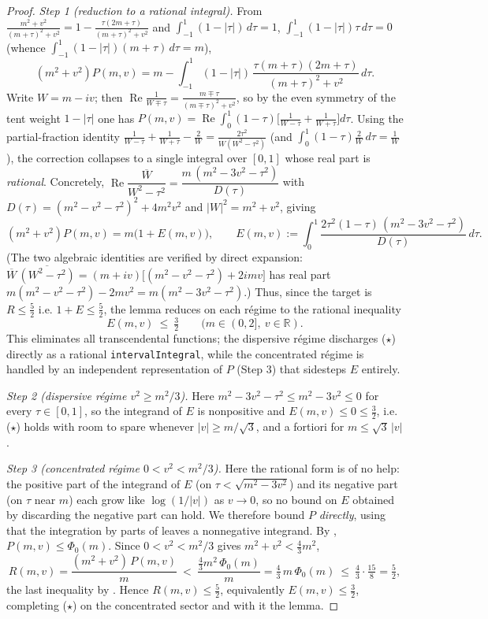 \begin{proof}
\emph{Step 1 (reduction to a rational integral).} From
$\frac{m^2+v^2}{(m+\tau)^2+v^2}=1-\frac{\tau(2m+\tau)}{(m+\tau)^2+v^2}$ and
$\int_{-1}^1(1-|\tau|)\,d\tau=1$, $\int_{-1}^1(1-|\tau|)\tau\,d\tau=0$ (whence
$\int_{-1}^1(1-|\tau|)(m+\tau)\,d\tau=m$),
\[
  (m^2+v^2)P(m,v)=m-\int_{-1}^{1}(1-|\tau|)\,
        \frac{\tau(m+\tau)(2m+\tau)}{(m+\tau)^2+v^2}\,d\tau .
\]
Write $W=m-iv$; then $\operatorname{Re}\tfrac1{W\mp\tau}=\tfrac{m\mp\tau}{(m\mp\tau)^2+v^2}$,
so by the even symmetry of the tent weight $1-|\tau|$ one has
$P(m,v)=\operatorname{Re}\int_0^1(1-\tau)\bigl[\tfrac1{W-\tau}+\tfrac1{W+\tau}\bigr]d\tau$.
Using the partial-fraction identity
$\frac1{W-\tau}+\frac1{W+\tau}-\frac2W=\frac{2\tau^2}{W(W^2-\tau^2)}$ (and
$\int_0^1(1-\tau)\tfrac2W\,d\tau=\tfrac1W$), the correction collapses to
a single integral over $[0,1]$ whose real part is \emph{rational}. Concretely,
$\operatorname{Re}\dfrac{\overline W}{W^2-\tau^2}=\dfrac{m\,(m^2-3v^2-\tau^2)}{D(\tau)}$
with $D(\tau)=(m^2-v^2-\tau^2)^2+4m^2v^2$ and $|W|^2=m^2+v^2$, giving
\[
  (m^2+v^2)P(m,v)=m\bigl(1+E(m,v)\bigr),\qquad
  E(m,v):=\int_0^1 \frac{2\tau^2(1-\tau)\,(m^2-3v^2-\tau^2)}{D(\tau)}\,d\tau .
\]
(The two algebraic identities are verified by direct expansion:
$\overline W\,\overline{(W^2-\tau^2)}=(m+iv)\bigl[(m^2-v^2-\tau^2)+2imv\bigr]$ has
real part $m(m^2-v^2-\tau^2)-2mv^2=m(m^2-3v^2-\tau^2)$.) Thus, since the target is
$R\le\tfrac52$ i.e. $1+E\le\tfrac52$, the lemma reduces on each régime to the
rational inequality
\[
  E(m,v)\ \le\ \tfrac32\qquad(m\in(0,2],\ v\in\mathbb R). \tag{$\star$}
\]
This eliminates all transcendental functions; the dispersive régime discharges
($\star$) directly as a rational \texttt{intervalIntegral}, while the concentrated
régime is handled by an independent representation of $P$ (Step 3) that sidesteps
$E$ entirely.

\emph{Step 2 (dispersive régime $v^2\ge m^2/3$).} Here
$m^2-3v^2-\tau^2\le m^2-3v^2\le0$ for every $\tau\in[0,1]$, so the integrand of
$E$ is nonpositive and $E(m,v)\le0\le\tfrac32$, i.e. ($\star$) holds with room to
spare whenever $|v|\ge m/\sqrt3$, and a fortiori for $m\le\sqrt3\,|v|$.

\emph{Step 3 (concentrated régime $0<v^2<m^2/3$).} Here the rational form is of no
help: the positive part of the integrand of $E$ (on $\tau<\sqrt{m^2-3v^2}$) and its
negative part (on $\tau$ near $m$) each grow like $\log(1/|v|)$ as $v\to0$, so no
bound on $E$ obtained by discarding the negative part can hold. We therefore bound
$P$ \emph{directly}, using that the integration by parts of
 leaves a nonnegative integrand. By ,
$P(m,v)\le\Phi_0(m)$. Since
$0<v^2<m^2/3$ gives $m^2+v^2<\tfrac43 m^2$,
\[
  R(m,v)=\frac{(m^2+v^2)\,P(m,v)}{m}
  \ <\ \frac{\tfrac43 m^2\,\Phi_0(m)}{m}
  =\tfrac43\,m\,\Phi_0(m)
  \ \le\ \tfrac43\cdot\tfrac{15}8=\tfrac52 ,
\]
the last inequality by . Hence $R(m,v)\le\tfrac52$,
equivalently $E(m,v)\le\tfrac32$, completing ($\star$) on the concentrated sector
and with it the lemma.


\end{proof}
